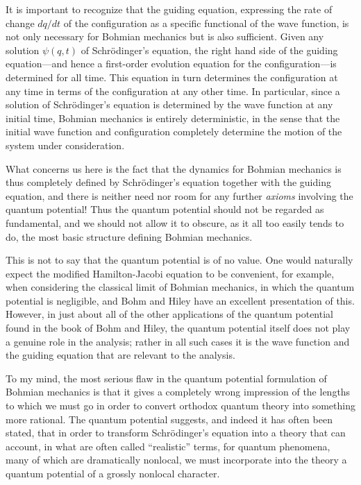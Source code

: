 \documentclass[12pt]{article}
\begin{document}
It is important to recognize that the guiding equation, expressing the rate
of change $dq/dt$ of the configuration as a specific functional of the wave
function, is not only necessary for Bohmian mechanics but is also
sufficient.  Given any solution $\psi(q,t)$ of Schr\"odinger's equation,
the right hand side of the guiding equation---and hence a first-order
evolution equation for the configuration---is determined for all time. This
equation in turn determines the configuration at any time in terms of the
configuration at any other time.  In particular, since a solution of
Schr\"odinger's equation is determined by the wave function at any initial
time, Bohmian mechanics is entirely deterministic, in the sense that the
initial wave function and configuration completely determine the motion of
the system under consideration.

What concerns us here is the fact that the dynamics for Bohmian mechanics
is thus completely defined by Schr\"odinger's equation together with the
guiding equation, and there is neither need nor room for any further {\it
axioms\/} involving the quantum potential! Thus the quantum potential
should not be regarded as fundamental, and we should not allow it to
obscure, as it all too easily tends to do, the most basic structure
defining Bohmian mechanics.

This is not to say that the quantum potential is of no value. One would
naturally expect the modified Hamilton-Jacobi equation to be convenient,
for example, when considering the classical limit of Bohmian mechanics, in
which the quantum potential is negligible, and Bohm and Hiley have an
excellent presentation of this.  However, in just about all of the other
applications of the quantum potential found in the book of Bohm and Hiley,
the quantum potential itself does not play a genuine role in the analysis;
rather in all such cases it is the wave function and the guiding equation
that are relevant to the analysis.

To my mind, the most serious flaw in the quantum potential formulation of
Bohmian mechanics is that it gives a completely wrong impression of the
lengths to which we must go in order to convert orthodox quantum theory
into something more rational. The quantum potential suggests, and indeed it
has often been stated, that in order to transform Schr\"odinger's equation
into a theory that can account, in what are often called ``realistic''
terms, for quantum phenomena, many of which are dramatically nonlocal, we
must incorporate into the theory a quantum potential of a grossly nonlocal
character.
\end{document}
